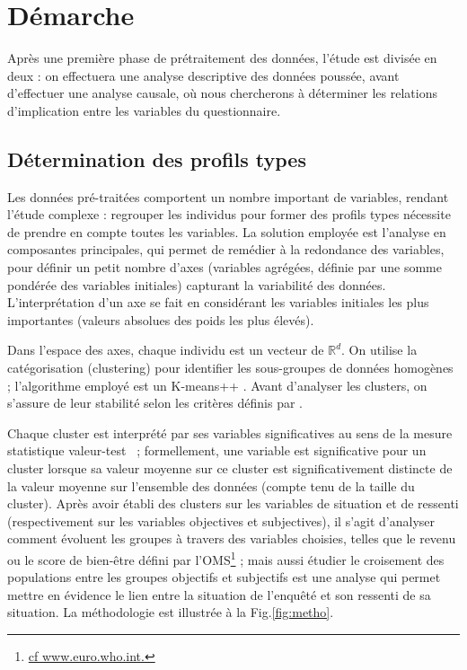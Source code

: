 \documentclass[11pt,fleqn,openany,frenchb]{book} %
\begin{document}
\section{Démarche}
Après une première phase de prétraitement des données, l'étude est
divisée en deux : on effectuera une analyse descriptive des données
poussée, avant d'effectuer une analyse causale, où nous chercherons à
déterminer les relations d'implication entre les variables du
questionnaire.\par

\subsection{Détermination des profils types}
Les données pré-traitées comportent un nombre important de variables,
rendant l'étude complexe : regrouper les individus pour former des
profils types nécessite de prendre en compte toutes les variables. La
solution employée est l'analyse en composantes principales, qui permet
de remédier à la redondance des variables, pour définir un petit
nombre d'axes (variables agrégées, définie par une somme pondérée des
variables initiales) capturant la variabilité des
données. L'interprétation d'un axe se fait en considérant les
variables initiales les plus importantes (valeurs absolues des poids
les plus élevés). \par

Dans l'espace des axes, chaque individu est un vecteur de
$\mathbb{R}^d$. On utilise la catégorisation (clustering) pour
identifier les sous-groupes de données homogènes ; l'algorithme
employé est un K-means++ \cite{arthur2007k}. Avant d'analyser les
clusters, on s'assure de leur stabilité selon les critères définis par
\cite{meilua2006uniqueness}. \par

Chaque cluster est interprété par ses variables significatives au sens
de la mesure statistique valeur-test \cite{lebart2006statistique}~;
formellement, une variable est significative pour un cluster lorsque
sa valeur moyenne sur ce cluster est significativement distincte de la
valeur moyenne sur l'ensemble des données (compte tenu de la taille du
cluster). Après avoir établi des clusters sur les variables de
situation et de ressenti (respectivement sur les variables objectives
et subjectives), il s'agit d'analyser comment évoluent les groupes à
travers des variables choisies, telles que le revenu ou le score de
bien-être défini par
l'OMS\footnote{\href{http://www.euro.who.int/fr/publications/abstracts/measurement-of-and-target-setting-for-well-being-an-initiative-by-the-who-regional-office-for-europe}{cf
    www.euro.who.int.}} ; mais aussi étudier le croisement des
populations entre les groupes objectifs et subjectifs est une analyse
qui permet mettre en évidence le lien entre la situation de l'enquêté
et son ressenti de sa situation. La méthodologie est illustrée à la
Fig.\ref{fig:metho}.\par
\end{document}
